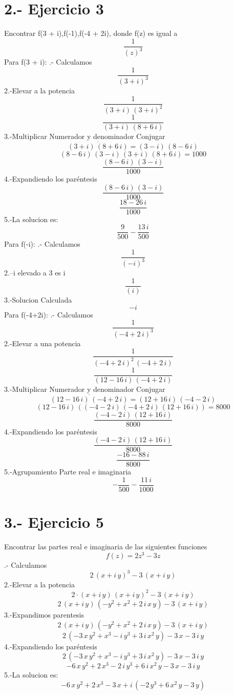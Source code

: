 \documentclass{article}
\begin{document}
\section*{2.- Ejercicio 3 }
\newline
Encontrar f(3 + i),f(-1),f(-4 + 2i), donde f(z) es igual a 
\[
\dfrac{1}{\left(z\right)^{3}}
\]
Para  f(3 + i):
.- Calculamos
\[
\dfrac{1}{\left(3+i\right)^{3}}
\]
2.-Elevar a la potencia
\[
\dfrac{1}{\left(3+i\right)\,\left(3+i\right)^{2}}
\]
\[
\dfrac{1}{\left(3+i\right)\,\left(8+6\,i\right)}
\]
3.-Multiplicar
Numerador y denominador
Conjugar
\[
\overline{\left(3+i\right)\,\left(8+6\,i\right)}=\left(3-i\right)\,\left(8-6\,i\right)
\]
\[
\left(8-6\,i\right)\,\left(3-i\right)\,\left(3+i\right)\,\left(8+6\,i\right)=1000
\]
\[
\dfrac{\left(8-6\,i\right)\,\left(3-i\right)}{1000}
\]
4.-Expandiendo los paréntesis
\[
\dfrac{\left(8-6\,i\right)\,\left(3-i\right)}{1000}
\]
\[
\dfrac{18-26\,i}{1000}
\]
5.-La solucion es: 
\[
\dfrac{9}{500}-\dfrac{13\,i}{500}
\]
\newline
Para  f(-i):
.- Calculamos
\[
\dfrac{1}{\left(-i\right)^{3}}
\]
2.--i elevado a 3 es i
\[
\dfrac{1}{\left(i\right)}
\]
3.-Solucion Calculada
\[
-i
\]
\newline
Para  f(-4+2i):
.- Calculamos
\[
\dfrac{1}{\left(-4+2\,i\right)^{3}}
\]
2.-Elevar a una potencia
\[
\dfrac{1}{\left(-4+2\,i\right)^{2}\,\left(-4+2\,i\right)}
\]
\[
\dfrac{1}{\left(12-16\,i\right)\,\left(-4+2\,i\right)}
\]
3.-Multiplicar
Numerador y denominador
Conjugar
\[
\overline{\left(12-16\,i\right)\,\left(-4+2\,i\right)}=\left(12+16\,i\right)\,\left(-4-2\,i\right)
\]
\[
\left(12-16\,i\right)\,\left(\left(-4-2\,i\right)\,\left(-4+2\,i\right)\,\left(12+16\,i\right)\right)=8000
\]
\[
\dfrac{\left(-4-2\,i\right)\,\left(12+16\,i\right)}{8000}
\]
4.-Expandiendo los paréntesis
\[
\dfrac{\left(-4-2\,i\right)\,\left(12+16\,i\right)}{8000}
\]
\[
\dfrac{-16-88\,i}{8000}
\]
5.-Agrupamiento
Parte real e imaginaria
\[
-\dfrac{1}{500}-\dfrac{11\,i}{1000}
\]
\section*{3.- Ejercicio 5 }
\newline
Encontrar las partes real e imaginaria de las siguientes funciones
\[
f(z) = 2z^3 - 3z
\]
.- Calculamos
\[
2\,\left(x+i\,y\right)^{3}-3\,\left(x+i\,y\right)
\]
2.-Elevar a la potencia
\[
2\cdot \left(x+i\,y\right)\,\left(x+i\,y\right)^{2}-3\,\left(x+i\,y\right)
\]
\[
2\,\left(x+i\,y\right)\,\left(-y^{2}+x^{2}+2\,i\,x\,y\right)-3\,\left(x+i\,y\right)
\]
3.-Expandimos parentesis
\[
2\,\left(x+i\,y\right)\,\left(-y^{2}+x^{2}+2\,i\,x\,y\right)-3\,\left(x+i\,y\right)
\]
\[
2\,\left(-3\,x\,y^{2}+x^{3}-i\,y^{3}+3\,i\,x^{2}\,y\right)-3\,x-3\,i\,y
\]
4.-Expandiendo los paréntesis
\[
2\,\left(-3\,x\,y^{2}+x^{3}-i\,y^{3}+3\,i\,x^{2}\,y\right)-3\,x-3\,i\,y
\]
\[
-6\,x\,y^{2}+2\,x^{3}-2\,i\,y^{3}+6\,i\,x^{2}\,y-3\,x-3\,i\,y
\]
5.-La solucion es: 
\[
-6\,x\,y^{2}+2\,x^{3}-3\,x+i\,\left(-2\,y^{3}+6\,x^{2}\,y-3\,y\right)
\]
\end{document}
